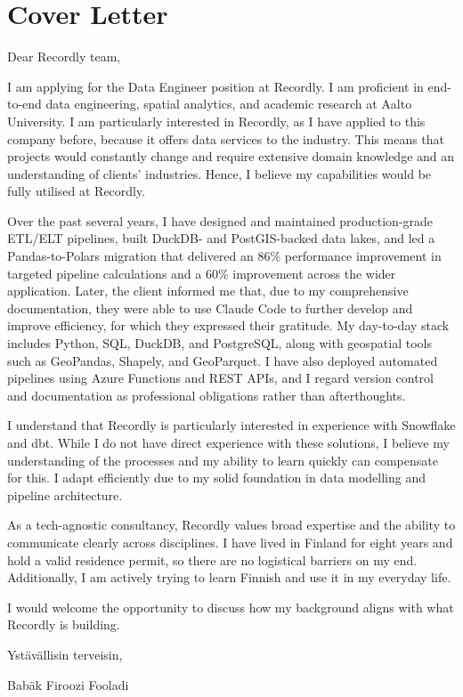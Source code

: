 \documentclass[a4paper,11pt]{article}
\begin{document}
	
	

	\section{Cover Letter}

Dear Recordly team,

I am applying for the Data Engineer position at Recordly. I am proficient in end-to-end data engineering, spatial analytics, and academic research at Aalto University. I am particularly interested in Recordly, as I have applied to this company before, because it offers data services to the industry. This means that projects would constantly change and require extensive domain knowledge and an understanding of clients' industries. Hence, I believe my capabilities would be fully utilised at Recordly.

Over the past several years, I have designed and maintained production-grade ETL/ELT pipelines, built DuckDB- and PostGIS-backed data lakes, and led a Pandas-to-Polars migration that delivered an 86\% performance improvement in targeted pipeline calculations and a 60\% improvement across the wider application. Later, the client informed me that, due to my comprehensive documentation, they were able to use Claude Code to further develop and improve efficiency, for which they expressed their gratitude. My day-to-day stack includes Python, SQL, DuckDB, and PostgreSQL, along with geospatial tools such as GeoPandas, Shapely, and GeoParquet. I have also deployed automated pipelines using Azure Functions and REST APIs, and I regard version control and documentation as professional obligations rather than afterthoughts.

I understand that Recordly is particularly interested in experience with Snowflake and dbt. While I do not have direct experience with these solutions, I believe my understanding of the processes and my ability to learn quickly can compensate for this. I adapt efficiently due to my solid foundation in data modelling and pipeline architecture.

As a tech-agnostic consultancy, Recordly values broad expertise and the ability to communicate clearly across disciplines. I have lived in Finland for eight years and hold a valid residence permit, so there are no logistical barriers on my end. Additionally, I am actively trying to learn Finnish and use it in my everyday life.

I would welcome the opportunity to discuss how my background aligns with what Recordly is building.

Ystävällisin terveisin,

Babäk Firoozi Fooladi
\end{document}
